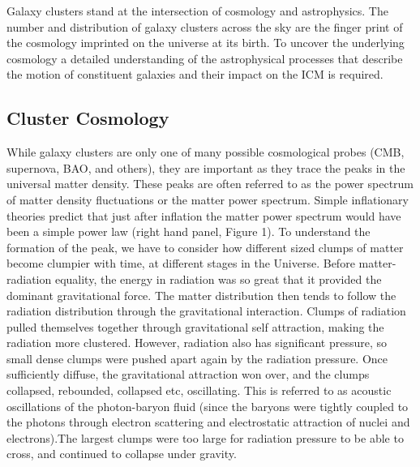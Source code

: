 Galaxy clusters stand at the intersection of cosmology and astrophysics. The number and distribution of galaxy clusters across the sky are the finger print of the cosmology imprinted on the universe at its birth. To uncover the underlying cosmology a detailed understanding of the astrophysical processes that describe the motion of constituent galaxies and their impact on the ICM is required.

\subsection{Cluster Cosmology}
While galaxy clusters are only one of many possible cosmological probes (CMB, supernova, BAO, and others), they are important as they trace the peaks in the universal matter density. These peaks are often referred to as the power spectrum of matter density fluctuations or the matter power spectrum.  Simple inflationary theories predict that just after inflation the matter power spectrum would have been a
simple power law (right hand panel, Figure 1). To understand the formation of the peak, we have to
consider how different sized clumps of matter become clumpier with time, at different stages in the
Universe.
Before matter-radiation equality, the energy in radiation was so great that it provided the dominant
gravitational force. The matter distribution then tends to follow the radiation distribution through the
gravitational interaction. Clumps of radiation pulled themselves together through gravitational self attraction,
making the radiation more clustered. However, radiation also has significant pressure, so small
dense clumps were pushed apart again by the radiation pressure. Once sufficiently diffuse, the
gravitational attraction won over, and the clumps collapsed, rebounded, collapsed etc, oscillating. This is
referred to as acoustic oscillations of the photon-baryon fluid (since the baryons were tightly coupled to the photons through electron scattering and electrostatic attraction of nuclei and electrons).The largest clumps
were too large for radiation pressure to be able to cross, and continued to collapse under gravity. 

